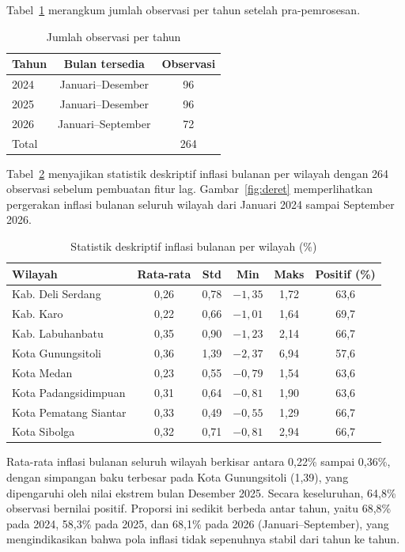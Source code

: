\documentclass[conference]{IEEEtran}
\begin{document}
Tabel~\ref{tab:data} merangkum jumlah observasi per tahun setelah pra-pemrosesan.

\begin{table}[htbp]
\caption{Jumlah observasi per tahun}
\label{tab:data}
\centering
\begin{tabular}{lcc}
\toprule
Tahun & Bulan tersedia & Observasi \\
\midrule
2024 & Januari--Desember & 96 \\
2025 & Januari--Desember & 96 \\
2026 & Januari--September & 72 \\
\midrule
Total & & 264 \\
\bottomrule
\end{tabular}
\end{table}

Tabel~\ref{tab:desk} menyajikan statistik deskriptif inflasi bulanan per wilayah dengan 264 observasi sebelum pembuatan fitur lag. Gambar~\ref{fig:deret} memperlihatkan pergerakan inflasi bulanan seluruh wilayah dari Januari 2024 sampai September 2026.

\begin{table}[htbp]
\caption{Statistik deskriptif inflasi bulanan per wilayah (\%)}
\label{tab:desk}
\centering
\begin{tabular}{lccccc}
\toprule
Wilayah & Rata-rata & Std & Min & Maks & Positif (\%) \\
\midrule
Kab. Deli Serdang & 0,26 & 0,78 & $-1{,}35$ & 1,72 & 63,6 \\
Kab. Karo & 0,22 & 0,66 & $-1{,}01$ & 1,64 & 69,7 \\
Kab. Labuhanbatu & 0,35 & 0,90 & $-1{,}23$ & 2,14 & 66,7 \\
Kota Gunungsitoli & 0,36 & 1,39 & $-2{,}37$ & 6,94 & 57,6 \\
Kota Medan & 0,23 & 0,55 & $-0{,}79$ & 1,54 & 63,6 \\
Kota Padangsidimpuan & 0,31 & 0,64 & $-0{,}81$ & 1,90 & 63,6 \\
Kota Pematang Siantar & 0,33 & 0,49 & $-0{,}55$ & 1,29 & 66,7 \\
Kota Sibolga & 0,32 & 0,71 & $-0{,}81$ & 2,94 & 66,7 \\
\bottomrule
\end{tabular}
\end{table}

Rata-rata inflasi bulanan seluruh wilayah berkisar antara 0,22\% sampai 0,36\%, dengan simpangan baku terbesar pada Kota Gunungsitoli (1,39), yang dipengaruhi oleh nilai ekstrem bulan Desember 2025. Secara keseluruhan, 64,8\% observasi bernilai positif. Proporsi ini sedikit berbeda antar tahun, yaitu 68,8\% pada 2024, 58,3\% pada 2025, dan 68,1\% pada 2026 (Januari--September), yang mengindikasikan bahwa pola inflasi tidak sepenuhnya stabil dari tahun ke tahun.
\end{document}
